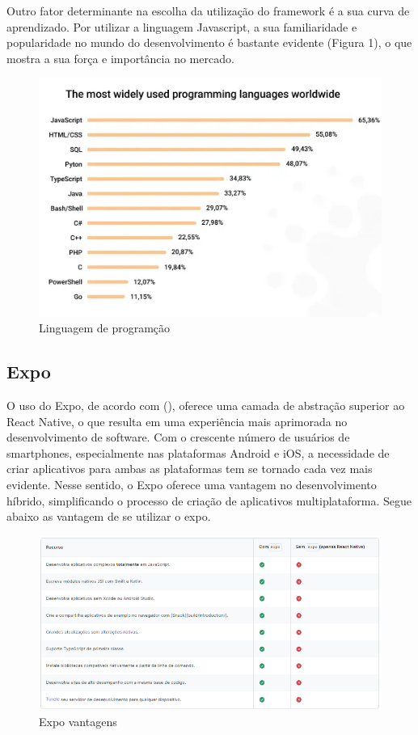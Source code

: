 Outro fator determinante na escolha da utilização do framework é a sua curva de aprendizado. Por utilizar a linguagem Javascript, a sua familiaridade e popularidade 
no mundo do desenvolvimento é bastante evidente (Figura 1), o que mostra a sua força e importância no mercado.

\begin{figure}[htb]
	\caption{\label{fig:Fig_1}Linguagem de programção}
	\begin{center}
		\includegraphics{images/top.png}
	\end{center}
\end{figure}

\subsection{Expo}

O uso do Expo, de acordo com (\textcite{Hugo}), oferece uma camada de abstração superior ao React Native, o que resulta em uma experiência mais aprimorada no 
desenvolvimento de software. Com o crescente número de usuários de smartphones, especialmente nas plataformas Android e iOS, a necessidade de criar aplicativos 
para ambas as plataformas tem se tornado cada vez mais evidente. Nesse sentido, o Expo oferece uma vantagem no desenvolvimento híbrido, simplificando o processo 
de criação de aplicativos multiplataforma. Segue abaixo as vantagem de se utilizar o expo.

\begin{figure}[htb]
	\caption{\label{fig:Fig_1}Expo vantagens}
	\begin{center}
		\includegraphics{images/expo.png}
	\end{center}
\end{figure}